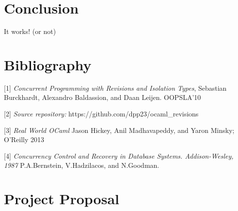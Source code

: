 \documentclass[12pt,twoside,notitlepage]{report}
\begin{document}
\cleardoublepage
\chapter{Conclusion}

It works! (or not)




\cleardoublepage



\cleardoublepage
\chapter{Bibliography}
\begin{description}
\item{[1]} \emph{Concurrent Programming with Revisions and Isolation Types}, Sebastian Burckhardt, Alexandro Baldassion, and Daan Leijen. OOPSLA'10
\item{[2]} \emph{Source repository:} https://github.com/dpp23/ocaml\_revisions
\item{[3]} \emph{Real World OCaml} Jason Hickey, Anil Madhavapeddy, and Yaron Minsky; O'Reilly 2013
\item{[4]} \emph{Concurrency Control and Recovery in Database Systems. Addison-Wesley, 1987} P.A.Bernstein, V.Hadzilacos, and N.Goodman.

\end{description}

\appendix


\chapter{Project Proposal}

%
\end{document}
